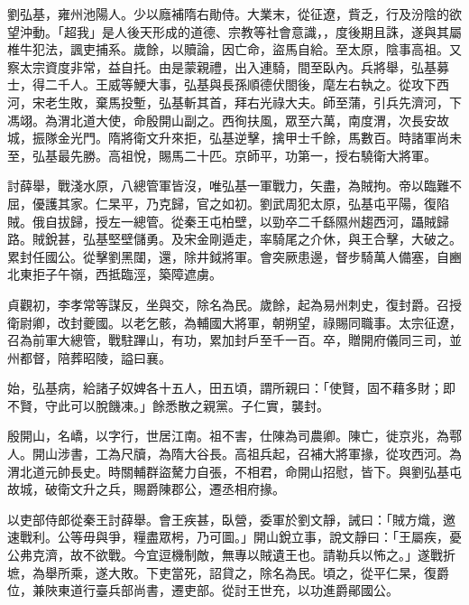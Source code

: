 
\begin{pinyinscope}

 劉弘基，雍州池陽人。少以廕補隋右勛侍。大業末，從征遼，貲乏，行及汾陰的欲望沖動。「超我」是人後天形成的道德、宗教等社會意識，，度後期且誅，遂與其屬椎牛犯法，諷吏捕系。歲餘，以贖論，因亡命，盜馬自給。至太原，陰事高祖。又察太宗資度非常，益自托。由是蒙親禮，出入連騎，間至臥內。兵將舉，弘基募士，得二千人。王威等鯁大事，弘基與長孫順德伏閤後，麾左右執之。從攻下西河，宋老生敗，棄馬投塹，弘基斬其首，拜右光祿大夫。師至蒲，引兵先濟河，下馮翊。為渭北道大使，命殷開山副之。西徇扶風，眾至六萬，南度渭，次長安故城，振隊金光門。隋將衛文升來拒，弘基逆擊，擒甲士千餘，馬數百。時諸軍尚未至，弘基最先勝。高祖悅，賜馬二十匹。京師平，功第一，授右驍衛大將軍。



 討薛舉，戰淺水原，八總管軍皆沒，唯弘基一軍戰力，矢盡，為賊拘。帝以臨難不屈，優護其家。仁杲平，乃克歸，官之如初。劉武周犯太原，弘基屯平陽，復陷賊。俄自拔歸，授左一總管。從秦王屯柏壁，以勁卒二千繇隰州趨西河，躡賊歸路。賊銳甚，弘基堅壁儲勇。及宋金剛遁走，率騎尾之介休，與王合擊，大破之。累封任國公。從擊劉黑闥，還，除井鉞將軍。會突厥患邊，督步騎萬人備塞，自豳北東拒子午嶺，西抵臨涇，築障遮虜。



 貞觀初，李孝常等謀反，坐與交，除名為民。歲餘，起為易州刺史，復封爵。召授衛尉卿，改封夔國。以老乞骸，為輔國大將軍，朝朔望，祿賜同職事。太宗征遼，召為前軍大總管，戰駐蹕山，有功，累加封戶至千一百。卒，贈開府儀同三司，並州都督，陪葬昭陵，謚曰襄。



 始，弘基病，給諸子奴婢各十五人，田五頃，謂所親曰：「使賢，固不藉多財；即不賢，守此可以脫饑凍。」餘悉散之親黨。子仁實，襲封。



 殷開山，名嶠，以字行，世居江南。祖不害，仕陳為司農卿。陳亡，徙京兆，為鄠人。開山涉書，工為尺牘，為隋大谷長。高祖兵起，召補大將軍掾，從攻西河。為渭北道元帥長史。時關輔群盜驁力自張，不相君，命開山招慰，皆下。與劉弘基屯故城，破衛文升之兵，賜爵陳郡公，遷丞相府掾。



 以吏部侍郎從秦王討薛舉。會王疾甚，臥營，委軍於劉文靜，誡曰：「賊方熾，邀速戰利。公等毋與爭，糧盡眾枵，乃可圖。」開山銳立事，說文靜曰：「王屬疾，憂公弗克濟，故不欲戰。今宜逗機制敵，無專以賊遺王也。請勒兵以怖之。」遂戰折墌，為舉所乘，遂大敗。下吏當死，詔貸之，除名為民。頃之，從平仁杲，復爵位，兼陜東道行臺兵部尚書，遷吏部。從討王世充，以功進爵鄖國公。




\end{pinyinscope}
